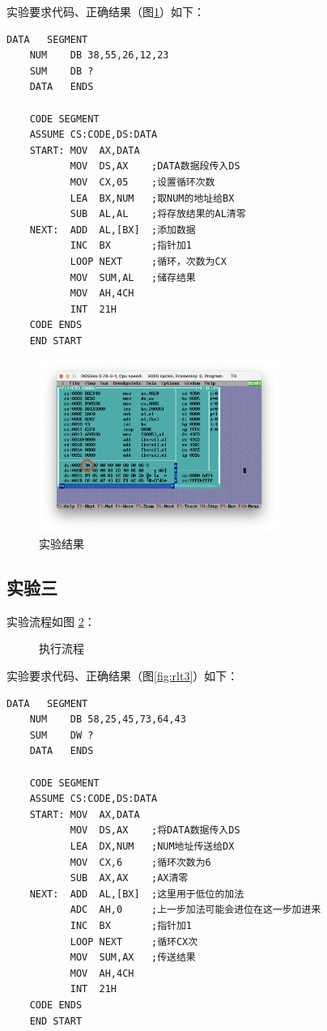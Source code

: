 \documentclass[11pt]{SEU-Digital-Report}
\begin{document}
实验要求代码、正确结果（图\ref{fig:rlt2}）如下：
\begin{lstlisting}[language={[x86masm]Assembler},title=exp32.asm]
    DATA   SEGMENT
    NUM    DB 38,55,26,12,23  
    SUM    DB ?
    DATA   ENDS

    CODE SEGMENT
    ASSUME CS:CODE,DS:DATA
    START: MOV  AX,DATA   
           MOV  DS,AX    ;DATA数据段传入DS
           MOV  CX,05    ;设置循环次数
           LEA  BX,NUM   ;取NUM的地址给BX
           SUB  AL,AL    ;将存放结果的AL清零
    NEXT:  ADD  AL,[BX]  ;添加数据
           INC  BX       ;指针加1
           LOOP NEXT     ;循环，次数为CX
           MOV  SUM,AL   ;储存结果
           MOV  AH,4CH
           INT  21H
    CODE ENDS
    END START
\end{lstlisting}

\begin{figure}[htbp]
    \centering
    \includegraphics[width=0.7\textwidth]{fig/rlt2.png}
    \caption{实验结果}
    \label{fig:rlt2}
\end{figure}

\subsection{实验三}
实验流程如图 \ref{fig:exp33}：
\begin{figure}[hbpt]
    \centering
    
    \caption{执行流程}
    \label{fig:exp33}
\end{figure}

实验要求代码、正确结果（图\ref{fig:rlt3}）如下：
\begin{lstlisting}[language={[x86masm]Assembler},title=exp33.asm]
    DATA   SEGMENT
    NUM    DB 58,25,45,73,64,43
    SUM    DW ?    
    DATA   ENDS

    CODE SEGMENT
    ASSUME CS:CODE,DS:DATA
    START: MOV  AX,DATA   
           MOV  DS,AX    ;将DATA数据传入DS
           LEA  DX,NUM   ;NUM地址传送给DX
           MOV  CX,6     ;循环次数为6
           SUB  AX,AX    ;AX清零
    NEXT:  ADD  AL,[BX]  ;这里用于低位的加法   
           ADC  AH,0     ;上一步加法可能会进位在这一步加进来
           INC  BX       ;指针加1
           LOOP NEXT     ;循环CX次
           MOV  SUM,AX   ;传送结果
           MOV  AH,4CH
           INT  21H
    CODE ENDS
    END START
\end{lstlisting}
\end{document}
